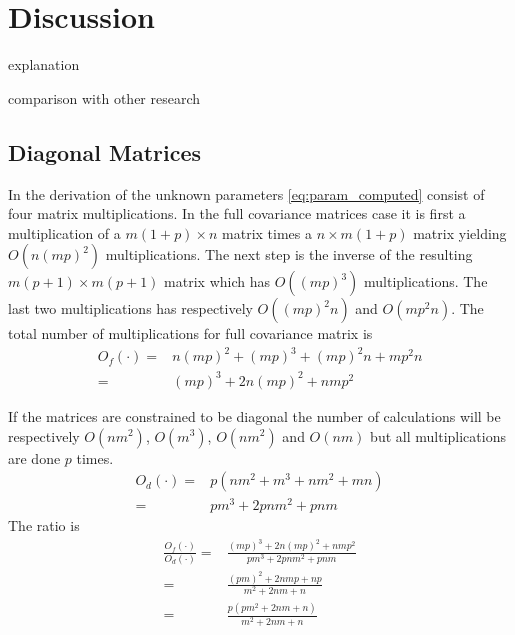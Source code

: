 \chapter{Discussion} %
\label{cha:discussion}
explanation

comparison with other research

\section{Diagonal Matrices} %
\label{sec:diagonal_matrices}
In the derivation of the unknown parameters \eqref{eq:param_computed} consist of four matrix multiplications. In the full covariance matrices case it is first a multiplication of a $m(1+p)\times n$ matrix times a $n\times m(1+p)$ matrix yielding $O(n(mp)^2)$ multiplications. The next step is the inverse of the resulting $m(p+1)\times m(p+1)$ matrix which has $O((mp)^3)$ multiplications. The last two multiplications has respectively $O((mp)^2n)$ and $O(mp^2n)$. The total number of multiplications for full covariance matrix is
\begin{equation}
	\begin{split}
		O_f(\cdot) = & n(mp)^2 + (mp)^3 + (mp)^2n + mp^2n \\
		= & (mp)^3 + 2n(mp)^2 + nmp^2
	\end{split}
\end{equation}

If the matrices are constrained to be diagonal the number of calculations will be respectively $O(nm^2)$, $O(m^3)$, $O(nm^2)$ and $O(nm)$ but all multiplications are done $p$ times.
\begin{equation}
	\begin{split}
		O_d(\cdot) = & p(nm^2 + m^3 + nm^2 + mn) \\
		= & pm^3 + 2pnm^2 + pnm
	\end{split}
\end{equation}
The ratio is
\begin{equation}
	\begin{split}
		\frac{O_f(\cdot)}{O_d(\cdot)} = & \frac{(mp)^3 + 2n(mp)^2 + nmp^2}{pm^3 + 2pnm^2 + pnm} \\
		= & \frac{(pm)^2 + 2nmp + np}{m^2 + 2nm + n} \\
		= & \frac{p(pm^2 + 2nm + n)}{m^2 + 2nm + n}
	\end{split}
\end{equation}

